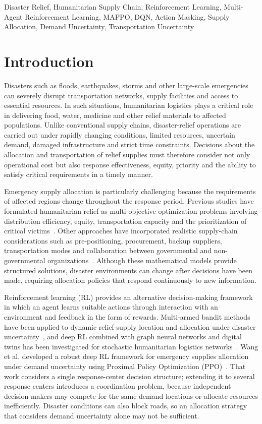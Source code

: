 \documentclass[conference]{IEEEtran}
\begin{document}
\begin{IEEEkeywords}
Disaster Relief, Humanitarian Supply Chain, Reinforcement Learning, Multi-Agent Reinforcement Learning, MAPPO, DQN, Action Masking, Supply Allocation, Demand Uncertainty, Transportation Uncertainty
\end{IEEEkeywords}


\section{Introduction}
Disasters such as floods, earthquakes, storms and other large-scale emergencies can severely disrupt transportation networks, supply facilities and access to essential resources. In such situations, humanitarian logistics plays a critical role in delivering food, water, medicine and other relief materials to affected populations. Unlike conventional supply chains, disaster-relief operations are carried out under rapidly changing conditions, limited resources, uncertain demand, damaged infrastructure and strict time constraints. Decisions about the allocation and transportation of relief supplies must therefore consider not only operational cost but also response effectiveness, equity, priority and the ability to satisfy critical requirements in a timely manner.

Emergency supply allocation is particularly challenging because the requirements of affected regions change throughout the response period. Previous studies have formulated humanitarian relief as multi-objective optimization problems involving distribution efficiency, equity, transportation capacity and the prioritization of critical victims~\cite{b1,b5}. Other approaches have incorporated realistic supply-chain considerations such as pre-positioning, procurement, backup suppliers, transportation modes and collaboration between governmental and non-governmental organizations~\cite{b4}. Although these mathematical models provide structured solutions, disaster environments can change after decisions have been made, requiring allocation policies that respond continuously to new information.

Reinforcement learning (RL) provides an alternative decision-making framework in which an agent learns suitable actions through interaction with an environment and feedback in the form of rewards. Multi-armed bandit methods have been applied to dynamic relief-supply location and allocation under disaster uncertainty~\cite{b3}, and deep RL combined with graph neural networks and digital twins has been investigated for stochastic humanitarian logistics networks~\cite{b2}. Wang et al. developed a robust deep RL framework for emergency supplies allocation under demand uncertainty using Proximal Policy Optimization (PPO)~\cite{b1}. That work considers a single response-center decision structure; extending it to several response centers introduces a coordination problem, because independent decision-makers may compete for the same demand locations or allocate resources inefficiently. Disaster conditions can also block roads, so an allocation strategy that considers demand uncertainty alone may not be sufficient.
\end{document}
